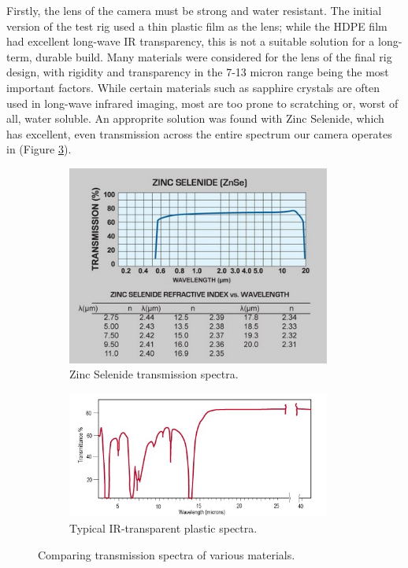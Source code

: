 Firstly, the lens of the camera must be strong and water resistant. The initial version of the test rig used a thin plastic film as the lens; while the HDPE film had excellent long-wave IR transparency, this is not a suitable solution for a long-term, durable build. Many materials were considered for the lens of the final rig design, with rigidity and transparency in the 7-13 micron range being the most important factors. While certain materials such as sapphire crystals are often used in long-wave infrared imaging, most are too prone to scratching or, worst of all, water soluble. An approprite solution was found with Zinc Selenide, which has excellent, even transmission across the entire spectrum our camera operates in (Figure \ref{fig:spectra}).

\begin{figure}
\centering
\begin{subfigure}{0.4\textwidth}
 \centering
 \includegraphics[width=0.95\textwidth]{"./image/zinc_selenide_spectra"}
 \caption{Zinc Selenide transmission spectra.}
 \label{fig:spectra:sub1}
\end{subfigure}
\begin{subfigure}{0.4\textwidth}
 \centering
 \includegraphics[width=0.95\textwidth]{"./image/edmund_plastic_spectra"}
 \caption{Typical IR-transparent plastic spectra.}
 \label{fig:spectra:sub2}
\end{subfigure}
\caption{Comparing transmission spectra of various materials.}
\label{fig:spectra}
\end{figure}

